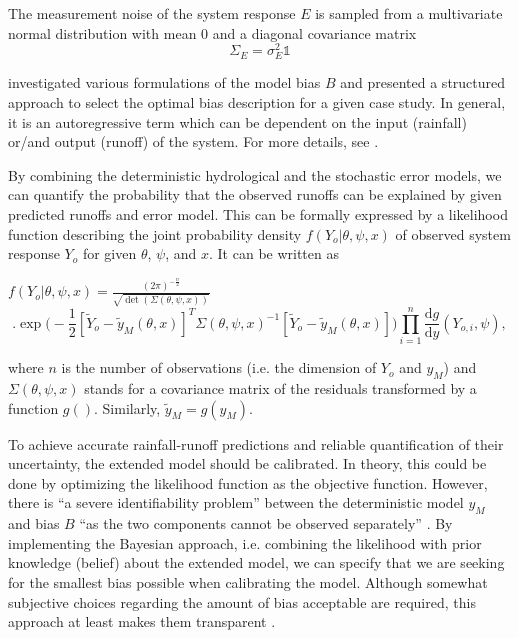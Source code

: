 \documentclass{ctuthesis}\usepackage[]{graphicx}\usepackage[]{color}
\begin{document}
The measurement noise of the system response $E$ is sampled from a multivariate normal distribution with mean 0 and a diagonal covariance matrix
\begin{equation}
\Sigma_E= \sigma_E^2 \mathds{1}
\end{equation}

\cite{giudice2013improving} investigated various formulations of the model bias $B$ and  presented a structured approach to select the optimal bias description
for a given case study. In general, it is an autoregressive term which can be dependent on the input (rainfall) or/and output (runoff) of the system. For more details, see \cite{giudice2013improving}.


By combining the deterministic hydrological and the stochastic error models, we can quantify the probability that the observed runoffs can be explained by given predicted runoffs and error model. This can be formally expressed by a likelihood function describing the joint probability density $f(Y_o|\theta, \psi, x)$ of observed system response $Y_o$ for given $\theta$, $\psi$, and $x$. It can be written as

$ f (Y_o|\theta, \psi, x) = \frac{(2\pi)^{-\frac{n}{2}}}{\sqrt{\det(\Sigma(\theta, \psi, x))}} $
\begin{equation}
. \exp \Big( -\frac{1}{2}  [ \tilde{Y}_{o} - \tilde{y}_{M}(\theta, x)]^{T}  \Sigma(\theta, \psi, x)^{-1}  [ \tilde{Y}_{o} - \tilde{y}_{M}(\theta, x)] \Big)  \prod^{n}_{i=1} \frac{\text{d}g}{\text{d}y} (Y_{o,i},\psi) ,
\end{equation}

where $n$ is the number of observations (i.e. the dimension of $Y_{o}$ and $y_{M}$) and $\Sigma(\theta, \psi, x)$ stands for a covariance matrix of the residuals transformed by a function $g()$. Similarly, $\tilde{y}_M=g(y_M)$.


To achieve accurate rainfall-runoff predictions and reliable quantification of their uncertainty, the extended model should be calibrated. In theory, this could be done by optimizing the likelihood function as the objective function. However, 
there is \enquote{a severe identifiability problem} between the deterministic model $y_M$ and bias $B$ \enquote{as the two components cannot be observed separately} \citep{reichert2012linking}. By implementing the Bayesian approach, i.e. combining the likelihood with prior knowledge (belief) about the extended model, we can specify that we are seeking for the smallest bias possible when calibrating the model. Although somewhat subjective choices regarding the amount of bias acceptable are required, this approach at least makes them transparent \citep{reichert2012linking}.
\end{document}
